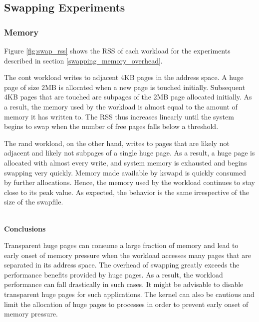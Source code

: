 \documentclass[twocolumn,11pt]{article}
\begin{document}
\subsection{Swapping Experiments}

\subsubsection{Memory}

Figure \ref{fig:swap_rss} shows the RSS of each workload for the
experiments described in section \ref{swapping_memory_overhead}. 

The cont workload writes to adjacent 4KB pages in the address space. A huge page
of size 2MB is allocated when a new page is touched initially. Subsequent 4KB
pages that are touched are subpages of the 2MB page allocated initially. As a
result, the memory used by the workload is almost equal to the amount of memory
it has written to. The RSS thus increases linearly until the system begins to
swap when the number of free pages falls below a threshold. 

The rand workload, on the other hand, writes to pages that are likely not
adjacent and likely not subpages of a single huge page. As a result, a huge page
is allocated with almost every write, and system memory is exhausted and begins
swapping very quickly. Memory made available by kswapd is quickly consumed by
further allocations. Hence, the memory used by the workload continues to stay
close to its peak value. As expected, the behavior is the same irrespective of
the size of the swapfile.

~\\ \textbf{Conclusions} 

Transparent huge pages can consume a large fraction of memory and lead to early
onset of memory pressure when the workload accesses many pages that are
separated in its address space. The overhead of swapping greatly exceeds the
performance benefits provided by huge pages. As a result, the workload
performance can fall drastically in such cases. It might be advisable to
disable transparent huge pages for such applications. The kernel can also be
cautious and limit the allocation of huge pages to processes in order to
prevent early onset of memory pressure.
\end{document}
